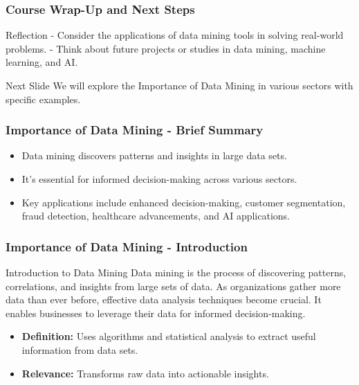\documentclass[aspectratio=169]{beamer}
\begin{document}
\begin{frame}[fragile]
    \frametitle{Course Wrap-Up and Next Steps}
    \begin{block}{Reflection}
        - Consider the applications of data mining tools in solving real-world problems.
        - Think about future projects or studies in data mining, machine learning, and AI.
    \end{block}
    \begin{block}{Next Slide}
        We will explore the Importance of Data Mining in various sectors with specific examples.
    \end{block}
\end{frame}

\begin{frame}[fragile]
    \frametitle{Importance of Data Mining - Brief Summary}
    \begin{itemize}
        \item Data mining discovers patterns and insights in large data sets.
        \item It's essential for informed decision-making across various sectors.
        \item Key applications include enhanced decision-making, customer segmentation, fraud detection, healthcare advancements, and AI applications.
    \end{itemize}
\end{frame}

\begin{frame}[fragile]
    \frametitle{Importance of Data Mining - Introduction}
    \begin{block}{Introduction to Data Mining}
        Data mining is the process of discovering patterns, correlations, and insights from large sets of data. As organizations gather more data than ever before, effective data analysis techniques become crucial. It enables businesses to leverage their data for informed decision-making.
    \end{block}
    \begin{itemize}
        \item \textbf{Definition:} Uses algorithms and statistical analysis to extract useful information from data sets.
        \item \textbf{Relevance:} Transforms raw data into actionable insights.
    \end{itemize}
\end{frame}
\end{document}
